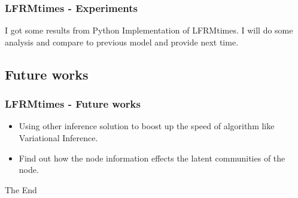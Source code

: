 \documentclass{beamer}
\begin{document}
\begin{frame}
\frametitle{LFRMtimes - Experiments}
I got some results from Python Implementation of LFRMtimes. I will do some analysis and compare to previous model and provide next time.
\end{frame}


\subsection{Future works} %

\begin{frame}
\frametitle{LFRMtimes - Future works}
\begin{itemize}
\item Using other inference solution to boost up the speed of algorithm like Variational Inference.
\item Find out how the node information effects the latent communities of the node.
\end{itemize}
\end{frame}


\begin{frame}
\Huge{\centerline{The End}}
\end{frame}

\end{document}
